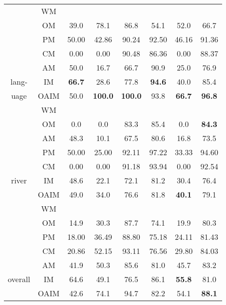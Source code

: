 {{{\begin{tabular}{|c|c|c|c|c|c|c|c|}
    &WM \\\cline{2-8}
    &OM &39.0   &78.1   &86.8   &54.1   &52.0   &66.7\\\cline{2-8}
    &PM &50.00	&42.86	&90.24	&92.50	&46.16	&91.36\\\cline{2-8}
        &CM &0.00	&0.00	&90.48	&86.36	&0.00	&88.37\\\cline{2-8}
     &AM    &50.0   &16.7   &66.7   &90.9   &25.0   &76.9\\\cline{2-8}
lang-   &IM &\textbf{66.7}  &28.6   &77.8   &\textbf{94.6}  &40.0   &85.4\\\cline{2-8}
uage    &OAIM   &50.0   &\textbf{100.0} &\textbf{100.0} &93.8   &\textbf{66.7}  &\textbf{96.8}\\\hline
&WM \\\cline{2-8}
     &OM    &0.0   &0.0   &83.3  &85.4  &0.0   &\textbf{84.3}\\\cline{2-8}
     &AM    &48.3   &10.1   &67.5   &80.6   &16.8   &73.5\\\cline{2-8}
     &PM &50.00	&25.00	&92.11	&97.22	&33.33	&94.60\\\cline{2-8}
        &CM &0.00	&0.00	&91.18	&93.94	&0.00	&92.54\\\cline{2-8}
river   &IM &48.6   &22.1   &72.1   &81.2   &30.4   &76.4\\\cline{2-8}
    &OAIM   &49.0   &34.0   &76.6   &81.8   &\textbf{40.1}  &79.1\\\hline
    &WM \\\cline{2-8}
     &OM    &14.9  &30.3  &87.7  &74.1  &19.9  &80.3\\\cline{2-8}
     &PM &18.00	&36.49	&88.80	&75.18	&24.11	&81.43\\\cline{2-8}
        &CM &20.86	&52.15	&93.11	&76.56	&29.80	&84.03\\\cline{2-8}
     &AM    &41.9   &50.3   &85.6   &81.0   &45.7   &83.2\\\cline{2-8}
overall &IM &64.6   &49.1   &76.5   &86.1   &\textbf{55.8}  &81.0\\\cline{2-8}
    &OAIM   &42.6   &74.1   &94.7   &82.2   &54.1   &\textbf{88.1}\\\hline
\end{tabular}}}
}
